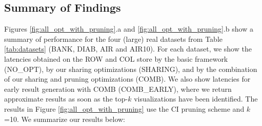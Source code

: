 

\subsection{Summary of Findings}
\label{sec:expt_summary}


Figures \ref{fig:all_opt_with_pruning}.a and \ref{fig:all_opt_with_pruning}.b show a summary of \SeeDB performance for the four 
(large) real datasets from Table \ref{tab:datasets} (BANK, DIAB, AIR and AIR10).
For each dataset, we show the latencies obtained on the ROW and COL store by the basic \SeeDB framework (NO\_OPT), 
by our sharing optimizations (SHARING), and by the combination of our sharing and pruning optimizations (COMB). 
We also show latencies for early result generation with COMB (COMB\_EARLY), where we return approximate results 
as soon as the top-$k$ visualizations have been identified.
The results in Figure \ref{fig:all_opt_with_pruning} 
use the CI pruning scheme and $k$=10. We summarize our results below:



